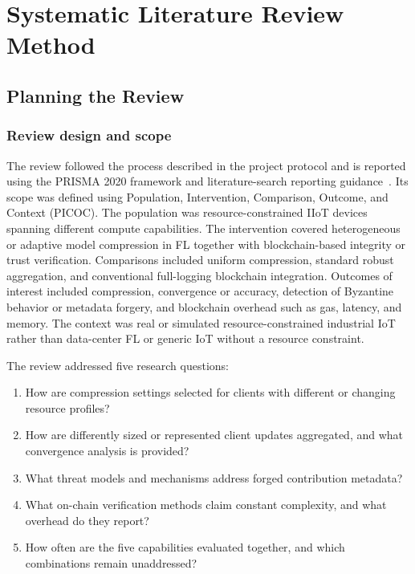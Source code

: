 \documentclass[journal]{IEEEtran}
\begin{document}
\section{Systematic Literature Review Method}
\label{sec:methods}

\subsection{Planning the Review}
\label{subsec:design}

\subsubsection{Review design and scope}

The review followed the process described in the project protocol and is reported using the PRISMA 2020 framework and literature-search reporting guidance~\cite{page2021prisma,rethlefsen2021prismas}. Its scope was defined using Population, Intervention, Comparison, Outcome, and Context (PICOC). The population was resource-constrained IIoT devices spanning different compute capabilities. The intervention covered heterogeneous or adaptive model compression in FL together with blockchain-based integrity or trust verification. Comparisons included uniform compression, standard robust aggregation, and conventional full-logging blockchain integration. Outcomes of interest included compression, convergence or accuracy, detection of Byzantine behavior or metadata forgery, and blockchain overhead such as gas, latency, and memory. The context was real or simulated resource-constrained industrial IoT rather than data-center FL or generic IoT without a resource constraint.

The review addressed five research questions:
\begin{enumerate}
  \item How are compression settings selected for clients with different or changing resource profiles?
  \item How are differently sized or represented client updates aggregated, and what convergence analysis is provided?
  \item What threat models and mechanisms address forged contribution metadata?
  \item What on-chain verification methods claim constant complexity, and what overhead do they report?
  \item How often are the five capabilities evaluated together, and which combinations remain unaddressed?
\end{enumerate}
\end{document}
